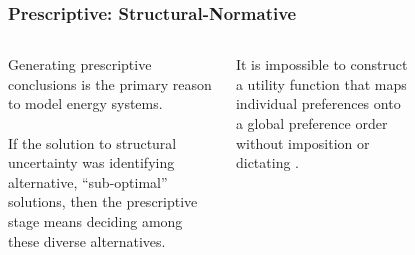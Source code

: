 \begin{frame}
    \frametitle{Prescriptive: Structural-Normative}
    \begin{columns}
        \column[t]{6cm}
        
        Generating prescriptive conclusions is the primary reason to model energy systems.\\~\\

        If the solution to structural uncertainty was identifying alternative, ``sub-optimal'' 
        solutions, then the prescriptive stage means deciding among these diverse alternatives.

        \begin{theorem}
            It is impossible to construct a utility function that maps individual preferences 
            onto a global preference order without imposition or dictating \cite{kasprzyk_many_2013,
            franssen_arrows_2005,arrow_difficulty_1950}.
        \end{theorem}

        \column[t]{4cm}
        \begin{figure}
            \centering
        \end{figure}
        
    \end{columns}

\end{frame}